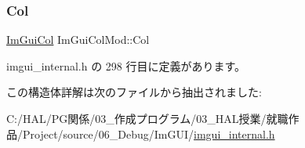 \subsubsection{\texorpdfstring{Col}{Col}}
{\footnotesize\ttfamily \mbox{\hyperlink{imgui_8h_a1b0467ec582e731ae6292fef726fb5fe}{Im\+Gui\+Col}} Im\+Gui\+Col\+Mod\+::\+Col}



 imgui\+\_\+internal.\+h の 298 行目に定義があります。



この構造体詳解は次のファイルから抽出されました\+:\begin{DoxyCompactItemize}
\item 
C\+:/\+H\+A\+L/\+P\+G関係/03\+\_\+作成プログラム/03\+\_\+\+H\+A\+L授業/就職作品/\+Project/source/06\+\_\+\+Debug/\+Im\+G\+U\+I/\mbox{\hyperlink{imgui__internal_8h}{imgui\+\_\+internal.\+h}}\end{DoxyCompactItemize}
